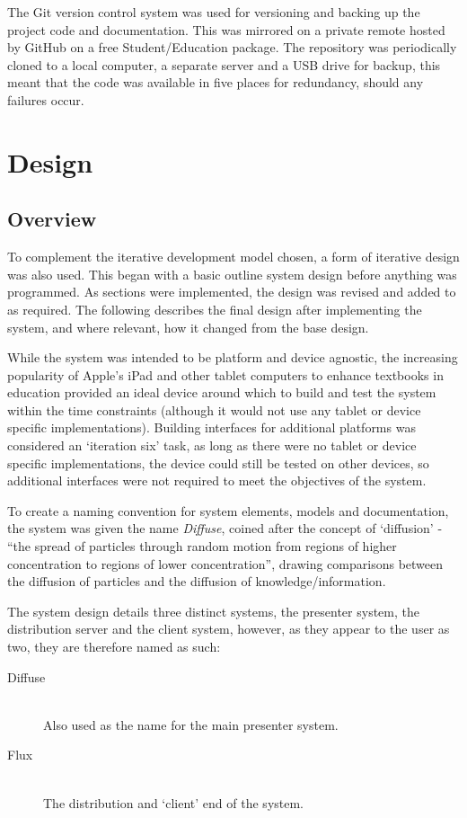 \documentclass[a4papert,11pt,notitlepage]{article}
\begin{document}
The Git\cite{git:web} version control system was used for versioning and backing up the project code and documentation. This was mirrored on a private remote hosted by GitHub\cite{github:web} on a free Student/Education package. The repository was periodically cloned to a local computer, a separate server and a USB drive for backup, this meant that the code was available in five places for redundancy, should any failures occur.

\pagebreak
\section{Design}
\subsection{Overview}
To complement the iterative development model chosen, a form of iterative design was also used. This began with a basic outline system design before anything was programmed. As sections were implemented, the design was revised and added to as required. The following describes the final design after implementing the system, and where relevant, how it changed from the base design.

While the system was intended to be platform and device agnostic, the increasing popularity of Apple's iPad\cite{ipadpopu:web} and other tablet computers to enhance textbooks in education provided an ideal device around which to build and test the system within the time constraints (although it would not use any tablet or device specific implementations). Building interfaces for additional platforms was considered an `iteration six' task, as long as there were no tablet or device specific implementations, the device could still be tested on other devices, so additional interfaces were not required to meet the objectives of the system.

To create a naming convention for system elements, models and documentation, the system was given the name \emph{Diffuse}, coined after the concept of `diffusion' - ``the spread of particles through random motion from regions of higher concentration to regions of lower concentration''\cite{diffusionwikipedia:web}, drawing comparisons between the diffusion of particles and the diffusion of knowledge/information.

The system design details three distinct systems, the presenter system, the distribution server and the client system, however, as they appear to the user as two, they are therefore named as such:
\begin{description}
\item[Diffuse] \hfill \\
Also used as the name for the main presenter system.
\item[Flux] \hfill \\
The distribution and `client' end of the system.
\end{description}
\end{document}
